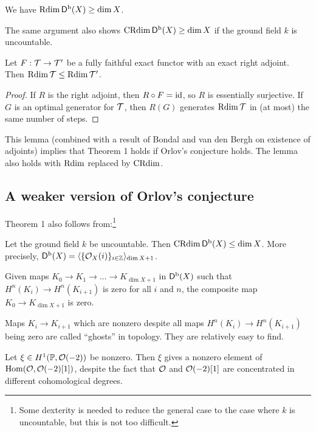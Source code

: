 \documentclass{amsart}
\begin{document}
\begin{lem}[Rouquier]
	We have $\operatorname{Rdim} \mathsf{D}^{\mathrm{b}}(X) \geq \dim X$.
\end{lem}

The same argument also shows $\operatorname{CRdim} \mathsf{D}^{\mathrm{b}}(X) \geq \dim X$ if the ground field $k$ is uncountable.

\begin{lem}
	Let $F: \mathcal{T} \to \mathcal{T}'$ be a fully faithful exact functor with an exact right adjoint.
	Then $\operatorname{Rdim} \mathcal{T} \leq \operatorname{Rdim} \mathcal{T}'$.
\end{lem}

\begin{proof}
	If $R$ is the right adjoint, then $R \circ F = \operatorname{id}$, so $R$ is essentially surjective.
	If $G$ is an optimal generator for $\mathcal{T}$, then $R(G)$ generates $\operatorname{Rdim} \mathcal{T}$ in (at most) the same number of steps.
\end{proof}

This lemma (combined with a result of Bondal and van den Bergh on existence of adjoints) implies that Theorem 1 holds if Orlov's conjecture holds.
The lemma also holds with $\operatorname{Rdim}$ replaced by $\operatorname{CRdim}$.

\subsection{A weaker version of Orlov's conjecture}

Theorem 1 also follows from:\footnote{Some dexterity is needed to reduce the general case to the case where $k$ is uncountable, but this is not too difficult.}

\begin{thm}[Theorem 2]
	Let the ground field $k$ be uncountable.
	Then $\operatorname{CRdim} \mathsf{D}^{\mathrm{b}}(X) \leq \dim X$.
	More precisely, $\mathsf{D}^{\mathrm{b}}(X) = \langle {\{\mathcal{O}_X(i)\}_{i \in \mathbb{Z}}} \rangle_{\dim X + 1}$.
\end{thm}

\begin{thm}[Theorem 3]
	Given maps $K_0 \to K_1 \to \dots \to K_{\dim X + 1}$ in $\mathsf{D}^{\mathrm{b}}(X)$ such that $H^n(K_i) \to H^n(K_{i+1})$ is zero for all $i$ and $n$, the composite map $K_0 \to K_{\dim X + 1}$ is zero.
\end{thm}

Maps $K_i \to K_{i+1}$ which are nonzero despite all maps $H^n(K_i) \to H^n(K_{i+1})$ being zero are called ``ghosts'' in topology.
They are relatively easy to find.

\begin{ex}
	Let $\xi \in H^1(\mathbb{P}, \mathcal{O}(-2))$ be nonzero.
	Then $\xi$ gives a nonzero element of $\operatorname{Hom}(\mathcal{O}, \mathcal{O}(-2)[1])$, despite the fact that $\mathcal{O}$ and $\mathcal{O}(-2)[1]$ are concentrated in different cohomological degrees.
\end{ex}
\end{document}

